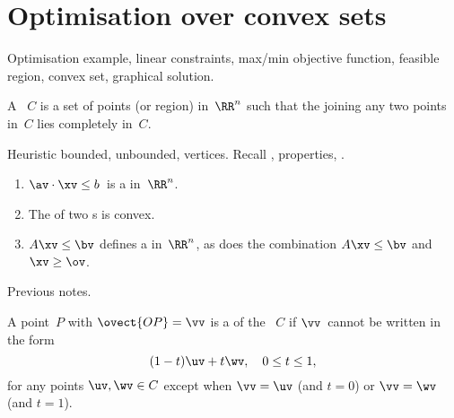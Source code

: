 
\chapter{Optimisation over convex sets}

\begin{comment}
Convex sets has pedagogical value: it revises previous material in a new context, it introduces modelling techniques, it sets a systematic tone for the course, it prepares students for further courses.
\end{comment}

\begin{remark} Optimisation example, linear constraints, max/min objective function, feasible region, convex set, graphical solution.
\end{remark}

\begin{definition}
 A ~$C$ is a set of points (or region) in~$\RR^n$ such that the  joining any two points in~$C$
lies completely in~$C$.
\end{definition}

\begin{remark}
Heuristic bounded, unbounded, vertices.
Recall , properties, .
\end{remark}


\begin{theorem} \label{thm:}
\begin{enumerate}
\item $\av\cdot\xv\leq b$~is a  in~$\RR^{n}$.
\item The  of two s is convex.
\item $A\xv\le \bv$ defines a  in~$\RR^n$, as does 
the combination $A\xv\le \bv$ and $\xv\ge \ov$.
\end{enumerate}
\end{theorem}
\begin{prof} Previous notes.
\end{prof}


\begin{definition}
A point~$P$ with  
$\ovect{OP} ={\vv}$ 
is a  of the ~$C$ if ${\vv}$~cannot be written in
the form
\begin{equation*}
(1-t){\uv}+t{\wv},\quad 0\leq t\leq 1,
\end{equation*}
for any points ${\uv},{\wv}\in C$ except when ${\vv}= {\uv}$ (and
$t=0$) or ${\vv}={\wv}$ (and $t=1$).
\end{definition}

